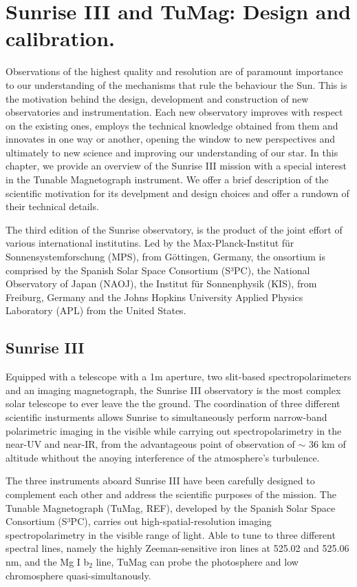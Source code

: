 \chapter{Sunrise III and TuMag: Design and calibration.}

Observations of the highest quality and resolution are of paramount importance to our understanding of the mechanisms that rule the behaviour the Sun. This is the motivation behind the design, development and construction of new observatories and instrumentation. Each new observatory improves with respect on the existing ones, employs the technical knowledge obtained from them and innovates in one way or another, opening the window to new perspectives and ultimately to new science and improving our understanding of our star. In this chapter, we provide an overview of the Sunrise III mission with a special interest in the Tunable Magnetograph instrument. We offer a brief description of the scientific motivation for its develpment and design choices and offer a rundown of their technical details.  

The third edition of the Sunrise observatory, is the product of the joint effort of various international institutins. Led by the Max-Planck-Institut für Sonnensystemforschung (MPS), from Göttingen, Germany, the onsortium is comprised by the Spanish Solar Space Consortium (S³PC), the National Observatory of Japan (NAOJ), the Institut für Sonnenphysik (KIS), from Freiburg, Germany and the Johns Hopkins University Applied Physics Laboratory (APL) from the United States.   



\section{Sunrise III}

Equipped with a telescope with a 1m aperture, two slit-based spectropolarimeters and an imaging magnetograph, the Sunrise III observatory is the most complex solar telescope to ever leave the the ground. The coordination of three different scientific insturments allows Sunrise to simultaneously perform narrow-band polarimetric imaging in the visible while carrying out spectropolarimetry in the near-UV and near-IR, from the advantageous point of observation of $\sim$ 36 km of altitude whithout the anoying interference of the atmosphere's turbulence. 

The three instruments aboard Sunrise III have been carefully designed to complement each other and address the scientific purposes of the mission. The Tunable Magnetograph (TuMag, REF), developed by the Spanish Solar Space Consortium (S³PC), carries out high-spatial-resolution imaging spectropolarimetry in the visible range of light. Able to tune to three different spectral lines, namely the highly Zeeman-sensitive iron lines at 525.02 and 525.06 nm, and the Mg I b$_2$ line, TuMag can probe the photosphere and low chromosphere quasi-simultanously. 

